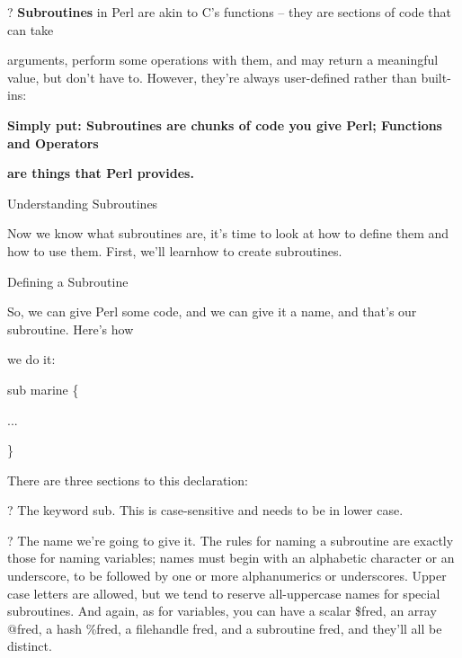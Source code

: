 \documentclass[a4paper,11pt]{book}
\begin{document}
\noindent 

\noindent ? \textbf{Subroutines }in Perl are akin to C's functions -- they are sections of code that can take

\noindent arguments, perform some operations with them, and may return a meaningful value, but don't have to. However, they're always user-defined rather than built-ins:

\noindent 

\noindent 

\noindent 

\noindent \textbf{Simply put: Subroutines are chunks of code you give Perl; Functions and Operators}

\noindent \textbf{are things that Perl provides.}

\noindent 

\noindent 

\noindent Understanding Subroutines

\noindent 

\noindent Now we know what subroutines are, it's time to look at how to define them and how to use them. First, we'll learnhow to create subroutines.

\noindent 

\noindent Defining a Subroutine

\noindent 

\noindent So,  we can  give Perl some code,  and  we  can  give  it  a  name,  and that's  our subroutine.  Here's  how

\noindent we do it:

\noindent 

\noindent 

\noindent sub marine \{

\noindent ...

\noindent \}

\noindent 

\noindent There are three sections to this declaration:

\noindent 

\noindent ? The keyword sub. This is case-sensitive and needs to be in lower case.

\noindent 

\noindent ? The name we're going to give it. The rules for naming a subroutine are exactly those for naming variables; names must begin with an alphabetic character or an underscore, to be followed by one or more alphanumerics or underscores. Upper case letters are allowed, but we tend to reserve all-uppercase names for special subroutines. And again, as for variables, you can have a scalar \$fred, an array @fred, a hash \%fred, a filehandle fred, and a subroutine fred, and they'll all be distinct.
\end{document}
